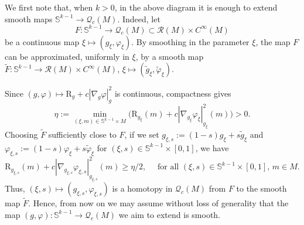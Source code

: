 \documentclass[11pt]{amsart}
\numberwithin{equation}{section}
\newcommand{\scal}{\mathrm{R}}
\let\geq\geqslant
\begin{document}
We first note that, when $k>0$, in the above diagram it is enough to extend smooth maps $\mathbb S^{k-1}\to\mathcal{Q}_c(M)$. Indeed,
let $$F:\mathbb S^{k-1}\to \mathcal{Q}_c(M)\subset\mathcal{R}(M)\times C^\infty(M)$$ be a continuous map $\xi \mapsto (g_\xi,\varphi_\xi)$. 
By smoothing in the parameter $\xi$, the map $F$ can be
approximated, uniformly in $\xi$,  by a smooth map $\widetilde F:\mathbb S^{k-1}\to \mathcal{R}(M)\times C^\infty(M)$, $\xi\mapsto (\widetilde g_\xi,\widetilde\varphi_\xi)$.

Since $(g,\varphi)\mapsto \scal_g+c|\nabla_g\varphi|_g^2$ is continuous, compactness gives $$\eta:=\min_{(\xi,m)\in\mathbb S^{k-1}\times M}\bigl(\scal_{g_\xi}(m)+c|\nabla_{g_\xi}\varphi_\xi|_{g_\xi}^2(m)\bigr)>0.$$
Choosing $\widetilde F$ sufficiently close to $F$, if we set $g_{\xi,s}:=(1-s)g_\xi+s\widetilde g_\xi$ and $\varphi_{\xi,s}:=(1-s)\varphi_\xi+s\widetilde\varphi_\xi$ for $(\xi,s)\in\mathbb S^{k-1}\times [0,1]$, we have $$\scal_{g_{\xi,s}}(m)+c|\nabla_{g_{\xi,s}}\varphi_{\xi,s}|_{g_{\xi,s}}^2(m)\geq \eta/2,\quad \textrm{ for all } (\xi,s)\in \mathbb S^{k-1}\times [0,1],\, m\in M.$$
Thus, $(\xi,s)\mapsto (g_{\xi,s},\varphi_{\xi,s})$ is a homotopy in $\mathcal Q_c(M)$ from $F$ to the smooth map $\widetilde F$. 
Hence, from now on we may assume without loss of generality that the map $(g,\varphi):\mathbb S^{k-1}\to \mathcal Q_c(M)$ we aim to extend is smooth.
\medskip
\end{document}
